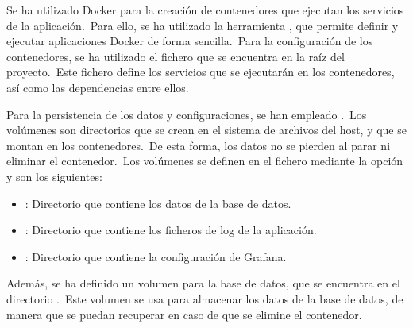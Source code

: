 
Se ha utilizado Docker para la creación de contenedores que ejecutan los servicios de la aplicación.\ Para ello, se ha
utilizado la herramienta , que permite definir y ejecutar aplicaciones Docker de forma
sencilla.\ Para la configuración de los contenedores, se ha utilizado el fichero  que se
encuentra en la raíz del proyecto.\ Este fichero define los servicios que se ejecutarán en los contenedores, así como
las dependencias entre ellos.

Para la persistencia de los datos y configuraciones, se han empleado .\ Los volúmenes son
directorios que se crean en el sistema de archivos del host, y que se montan en los contenedores.\ De esta forma, los
datos no se pierden al parar ni eliminar el contenedor.\ Los volúmenes se definen en el fichero
 mediante la opción  y son los siguientes:

\begin{itemize}
	\item {}: Directorio que contiene los datos de la base de datos.
	\item {}: Directorio que contiene los ficheros de log de la aplicación.
	\item {}: Directorio que contiene la configuración de Grafana.
\end{itemize}

Además, se ha definido un volumen para la base de datos, que se encuentra en el
directorio .\ Este volumen se usa para almacenar los datos de la base de datos, de manera que se
puedan recuperar en caso de que se elimine el contenedor.

